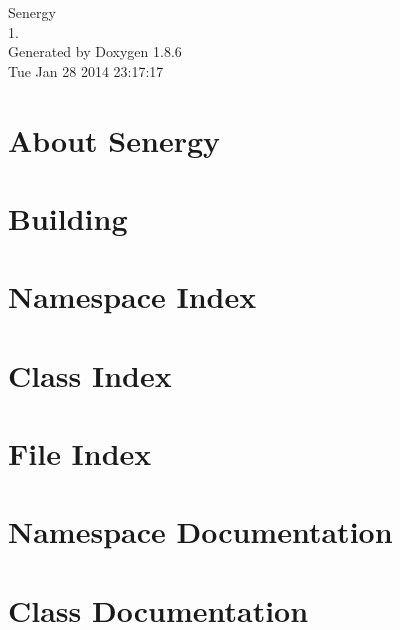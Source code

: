 \documentclass[twoside]{book}
\newcommand{\clearemptydoublepage}{%
  \newpage{\pagestyle{empty}\cleardoublepage}%
}
\begin{document}
\hypersetup{pageanchor=false}
\begin{titlepage}
\vspace*{7cm}
\begin{center}%
{\Large Senergy \\[1ex]\large 1. }\\
\vspace*{1cm}
{\large Generated by Doxygen 1.8.6}\\
\vspace*{0.5cm}
{\small Tue Jan 28 2014 23:17:17}\\
\end{center}
\end{titlepage}
\clearemptydoublepage
\tableofcontents
\clearemptydoublepage
{}
\hypersetup{pageanchor=true}

\chapter{About Senergy}
\label{index}\hypertarget{index}{}
\chapter{Building}
\label{a}
\hypertarget{a}{}

\chapter{Namespace Index}

\chapter{Class Index}

\chapter{File Index}

\chapter{Namespace Documentation}



\chapter{Class Documentation}










\end{document}
